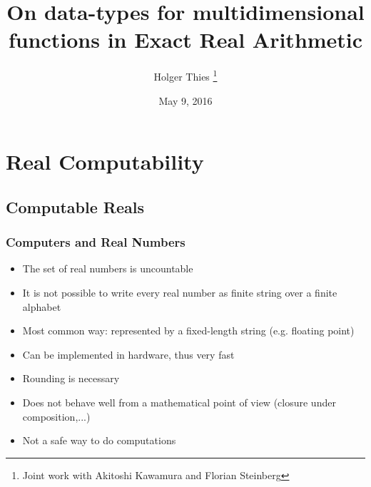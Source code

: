 \documentclass[xcolor=pdftex,dvipsnames,table]{beamer}
\title[data-types for multidimensional functions]{On data-types for multidimensional functions in Exact Real Arithmetic
}
\author[ H. Thies]{
		Holger Thies \footnote{Joint work with Akitoshi Kawamura and Florian Steinberg}
}
\institute[The University of Tokyo]{
  The University of Tokyo
}
\begin{document}
\date{May 9, 2016}
\frame{
\titlepage
}
\section{Real Computability}
\subsection{Computable Reals}
\begin{frame}
  \frametitle{Computers and Real Numbers}
  \begin{itemize}[<+->]
  \item The set of real numbers is uncountable
    \item It is not possible to write every real number as finite string over a finite alphabet
    \item Most common way: represented by a fixed-length string (e.g. floating point)
    \item Can be implemented in hardware, thus very fast
      \item Rounding is necessary
     \item Does not behave well from a mathematical point of view (closure under composition,...) 
       \item Not a safe way to do computations
    \end{itemize}
  \end{frame}
\end{document}
